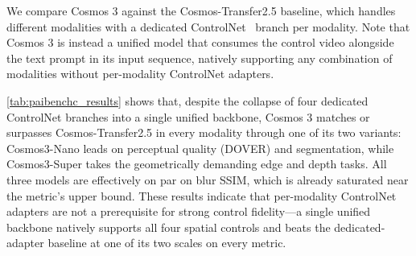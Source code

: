 We compare Cosmos 3 against the Cosmos-Transfer2.5 baseline, which handles different modalities with a dedicated ControlNet~\citep{Zhang_2023_ICCV} branch per modality. Note that Cosmos 3 is instead a unified model that consumes the control video alongside the text prompt in its input sequence, natively supporting any combination of modalities without per-modality ControlNet adapters.

\cref{tab:paibenchc_results} shows that, despite the collapse of four dedicated ControlNet branches into a single unified backbone, Cosmos 3 matches or surpasses Cosmos-Transfer2.5 in every modality
through one of its two variants: Cosmos3-Nano leads on perceptual
quality (DOVER) and segmentation, while Cosmos3-Super takes the
geometrically demanding edge and depth tasks. All three models are effectively on par on blur SSIM, which is already saturated near the metric's upper bound. These results
indicate that per-modality ControlNet adapters are not a
prerequisite for strong control fidelity---a single unified
backbone natively supports all four spatial controls and beats the
dedicated-adapter baseline at one of its two scales on every metric.




